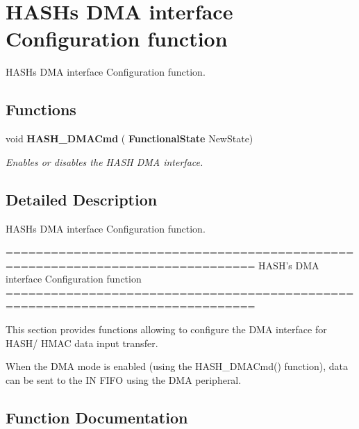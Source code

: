 \section{H\+A\+SH\textquotesingle{}s D\+MA interface Configuration function}
\label{group__HASH__Group4}


H\+A\+SH\textquotesingle{}s D\+MA interface Configuration function.  


\subsection*{Functions}
\begin{DoxyCompactItemize}
\item 
void \textbf{ H\+A\+S\+H\+\_\+\+D\+M\+A\+Cmd} (\textbf{ Functional\+State} New\+State)
\begin{DoxyCompactList}\small\item\em Enables or disables the H\+A\+SH D\+MA interface. \end{DoxyCompactList}\end{DoxyCompactItemize}


\subsection{Detailed Description}
H\+A\+SH\textquotesingle{}s D\+MA interface Configuration function. 

\begin{DoxyVerb} ===============================================================================
                   HASH's DMA interface Configuration function
 ===============================================================================  

  This section provides functions allowing to configure the DMA interface for 
  HASH/ HMAC data input transfer.
   
  When the DMA mode is enabled (using the HASH_DMACmd() function), data can be 
  sent to the IN FIFO using the DMA peripheral.\end{DoxyVerb}
 

\subsection{Function Documentation}
\mbox{\label{group__HASH__Group4_ga6bc756803b0b3a03eecc47cb570e1bd3}} 
